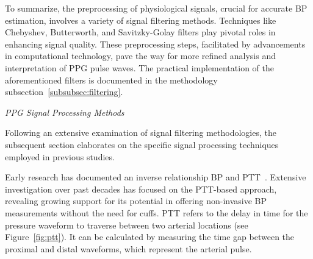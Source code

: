 To summarize, the preprocessing of physiological signals, crucial for accurate BP estimation, involves a variety of signal filtering methods.
Techniques like Chebyshev, Butterworth, and Savitzky-Golay filters play pivotal roles in enhancing signal quality.
These preprocessing steps, facilitated by advancements in computational technology, pave the way for more refined analysis and interpretation of PPG pulse waves.
The practical implementation of the aforementioned filters is documented in the methodology subsection~\ref{subsubsec:filtering}.

\vspace{0.6cm}
\textit{PPG Signal Processing Methods}
\vspace{0.2cm}

Following an extensive examination of signal filtering methodologies, the subsequent section elaborates on the specific signal processing techniques employed in previous studies.

Early research has documented an inverse relationship BP and \ac{PTT}~\cite{mukkamalaUbiquitousBloodPressure2015}.
Extensive investigation over past decades has focused on the PTT-based approach, revealing growing support for its potential in offering non-invasive BP measurements without the need for cuffs.
PTT refers to the delay in time for the pressure waveform to traverse between two arterial locations (see Figure~\ref{fig:ptt}).
It can be calculated by measuring the time gap between the proximal and distal waveforms, which represent the arterial pulse.

